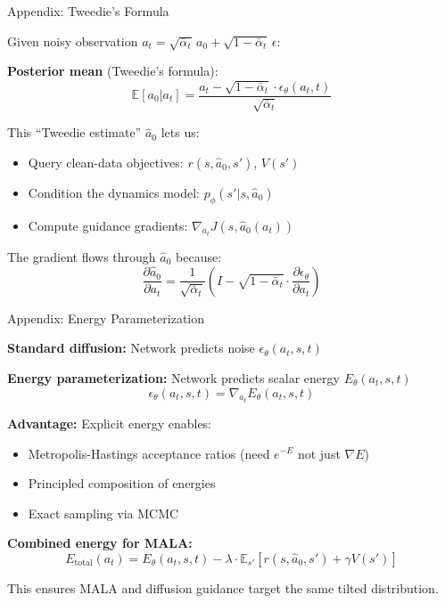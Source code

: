 \documentclass[aspectratio=169]{beamer}
\begin{document}
\begin{frame}{Appendix: Tweedie's Formula}

Given noisy observation $a_t = \sqrt{\bar{\alpha}_t}\, a_0 + \sqrt{1-\bar{\alpha}_t}\, \epsilon$:

\vspace{0.5em}
\textbf{Posterior mean} (Tweedie's formula):
\[
\mathbb{E}[a_0 | a_t] = \frac{a_t - \sqrt{1-\bar{\alpha}_t} \cdot \epsilon_\theta(a_t, t)}{\sqrt{\bar{\alpha}_t}}
\]

\vspace{0.5em}
This ``Tweedie estimate'' $\hat{a}_0$ lets us:
\begin{itemize}
    \item Query clean-data objectives: $r(s, \hat{a}_0, s')$, $V(s')$
    \item Condition the dynamics model: $p_\phi(s' | s, \hat{a}_0)$
    \item Compute guidance gradients: $\nabla_{a_t} J(s, \hat{a}_0(a_t))$
\end{itemize}

\vspace{0.5em}
The gradient flows through $\hat{a}_0$ because:
\[
\frac{\partial \hat{a}_0}{\partial a_t} = \frac{1}{\sqrt{\bar{\alpha}_t}}\left(I - \sqrt{1-\bar{\alpha}_t} \cdot \frac{\partial \epsilon_\theta}{\partial a_t}\right)
\]

\end{frame}

\begin{frame}{Appendix: Energy Parameterization}

\textbf{Standard diffusion:} Network predicts noise $\epsilon_\theta(a_t, s, t)$

\textbf{Energy parameterization:} Network predicts scalar energy $E_\theta(a_t, s, t)$
\[
\epsilon_\theta(a_t, s, t) = \nabla_{a_t} E_\theta(a_t, s, t)
\]

\vspace{0.5em}
\textbf{Advantage:} Explicit energy enables:
\begin{itemize}
    \item Metropolis-Hastings acceptance ratios (need $e^{-E}$ not just $\nabla E$)
    \item Principled composition of energies
    \item Exact sampling via MCMC
\end{itemize}

\vspace{0.5em}
\textbf{Combined energy for MALA:}
\[
E_{\text{total}}(a_t) = E_\theta(a_t, s, t) - \lambda \cdot \mathbb{E}_{s'}\left[r(s, \hat{a}_0, s') + \gamma V(s')\right]
\]

This ensures MALA and diffusion guidance target the same tilted distribution.

\end{frame}
\end{document}

